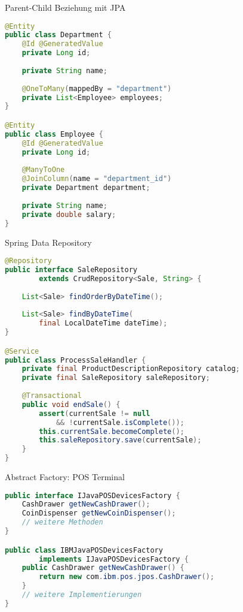\begin{example}{Parent-Child Beziehung mit JPA}
\begin{lstlisting}[language=Java, style=base]
@Entity
public class Department {
    @Id @GeneratedValue
    private Long id;
    
    private String name;
    
    @OneToMany(mappedBy = "department")
    private List<Employee> employees;
}

@Entity
public class Employee {
    @Id @GeneratedValue
    private Long id;
    
    @ManyToOne
    @JoinColumn(name = "department_id")
    private Department department;
    
    private String name;
    private double salary;
}
\end{lstlisting}
\end{example}

\begin{example}{Spring Data Repository}
\begin{lstlisting}[language=Java, style=base]
@Repository
public interface SaleRepository 
        extends CrudRepository<Sale, String> {
    
    List<Sale> findOrderByDateTime();
    
    List<Sale> findByDateTime(
        final LocalDateTime dateTime);
}

@Service
public class ProcessSaleHandler {
    private final ProductDescriptionRepository catalog;
    private final SaleRepository saleRepository;
    
    @Transactional
    public void endSale() {
        assert(currentSale != null 
            && !currentSale.isComplete());
        this.currentSale.becomeComplete();
        this.saleRepository.save(currentSale);
    }
}
\end{lstlisting}
\end{example}

\begin{example}{Abstract Factory: POS Terminal}
\begin{lstlisting}[language=Java, style=base]
public interface IJavaPOSDevicesFactory {
    CashDrawer getNewCashDrawer();
    CoinDispenser getNewCoinDispenser();
    // weitere Methoden
}

public class IBMJavaPOSDevicesFactory 
        implements IJavaPOSDevicesFactory {
    public CashDrawer getNewCashDrawer() {
        return new com.ibm.pos.jpos.CashDrawer();
    }
    // weitere Implementierungen
}
\end{lstlisting}
\end{example}

